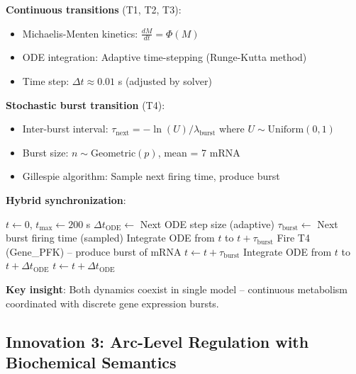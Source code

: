 \textbf{Continuous transitions} (T1, T2, T3):

\begin{itemize}
    \item Michaelis-Menten kinetics: $\frac{dM}{dt} = \Phi(M)$
    \item ODE integration: Adaptive time-stepping (Runge-Kutta method)
    \item Time step: $\Delta t \approx 0.01$ s (adjusted by solver)
\end{itemize}

\textbf{Stochastic burst transition} (T4):

\begin{itemize}
    \item Inter-burst interval: $\tau_{\text{next}} = -\ln(U) / \lambda_{\text{burst}}$ where $U \sim \text{Uniform}(0,1)$
    \item Burst size: $n \sim \text{Geometric}(p)$, mean = 7 mRNA
    \item Gillespie algorithm: Sample next firing time, produce burst
\end{itemize}

\textbf{Hybrid synchronization}:

\begin{algorithm}[H]
\caption{Hybrid scheduler for Example 5}
\begin{algorithmic}[1]
\State $t \gets 0$, $t_{\max} \gets 200$ s
    \State $\Delta t_{\text{ODE}} \gets$ Next ODE step size (adaptive)
    \State $\tau_{\text{burst}} \gets$ Next burst firing time (sampled)
        \State Integrate ODE from $t$ to $t + \tau_{\text{burst}}$
        \State Fire T4 (Gene\_PFK) -- produce burst of mRNA
        \State $t \gets t + \tau_{\text{burst}}$
    \Else
        \State Integrate ODE from $t$ to $t + \Delta t_{\text{ODE}}$
        \State $t \gets t + \Delta t_{\text{ODE}}$
    \EndIf
\EndWhile
\end{algorithmic}
\end{algorithm}

\textbf{Key insight}: Both dynamics coexist in single model -- continuous metabolism coordinated with discrete gene expression bursts.

\subsection{Innovation 3: Arc-Level Regulation with Biochemical Semantics}
\label{subsec:energy-regulation}

